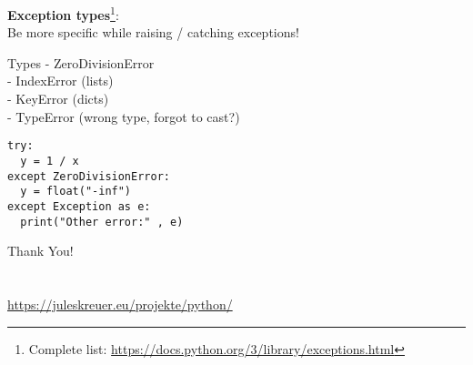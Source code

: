 \documentclass{beamer}
\begin{document}
\begin{frame}[fragile]
    \textbf{Exception types}\footnote{Complete list: \url{https://docs.python.org/3/library/exceptions.html}}:\\
    Be more specific while raising / catching exceptions!
    \begin{exampleblock}{Types}
    - ZeroDivisionError\\
    - IndexError (lists)\\
    - KeyError (dicts)\\
    - TypeError (wrong type, forgot to cast?)
    \end{exampleblock}
    \begin{example}
\begin{verbatim}
try:
  y = 1 / x
except ZeroDivisionError:
  y = float("-inf")
except Exception as e:
  print("Other error:" , e)
\end{verbatim}
    \end{example}

\end{frame}

\begin{frame}[fragile]
\centering
\LARGE
Thank You!\\
\vspace{0.5cm}
    \\\\
\large
    \url{https://juleskreuer.eu/projekte/python/}
\end{frame}
\end{document}
